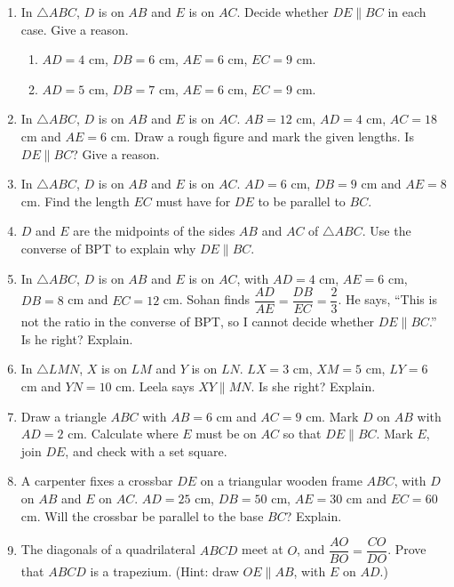 \documentclass[11pt,a4paper]{article}
\theoremstyle{brand}
\theoremstyle{branddef}
\newcommand{\tr}{\triangle}
\newenvironment{exercise}[1]
  {\par\medskip\Needspace{7\baselineskip}\noindent{\large\bfseries\color{accent}Exercise #1}
   \par\smallskip
   \begin{enumerate}[leftmargin=*,itemsep=4pt]}
  {\end{enumerate}}
\begin{document}
\begin{exercise}{2C}
  \item In $\tr ABC$, $D$ is on $AB$ and $E$ is on $AC$. Decide whether $DE\parallel BC$ in each case. Give a reason.
  \begin{enumerate}[label=(\alph*),itemsep=1pt]
    \item $AD=4$ cm, $DB=6$ cm, $AE=6$ cm, $EC=9$ cm.
    \item $AD=5$ cm, $DB=7$ cm, $AE=6$ cm, $EC=9$ cm.
  \end{enumerate}
  \item In $\tr ABC$, $D$ is on $AB$ and $E$ is on $AC$. $AB=12$ cm, $AD=4$ cm, $AC=18$ cm and $AE=6$ cm. Draw a rough figure and mark the given lengths. Is $DE\parallel BC$? Give a reason.
  \item In $\tr ABC$, $D$ is on $AB$ and $E$ is on $AC$. $AD=6$ cm, $DB=9$ cm and $AE=8$ cm. Find the length $EC$ must have for $DE$ to be parallel to $BC$.
  \item $D$ and $E$ are the midpoints of the sides $AB$ and $AC$ of $\tr ABC$. Use the converse of BPT to explain why $DE\parallel BC$.
  \item In $\tr ABC$, $D$ is on $AB$ and $E$ is on $AC$, with $AD=4$ cm, $AE=6$ cm, $DB=8$ cm and $EC=12$ cm. Sohan finds $\dfrac{AD}{AE}=\dfrac{DB}{EC}=\dfrac23$. He says, ``This is not the ratio in the converse of BPT, so I cannot decide whether $DE\parallel BC$.'' Is he right? Explain.
  \item In $\tr LMN$, $X$ is on $LM$ and $Y$ is on $LN$. $LX=3$ cm, $XM=5$ cm, $LY=6$ cm and $YN=10$ cm. Leela says $XY\parallel MN$. Is she right? Explain.
  \item Draw a triangle $ABC$ with $AB=6$ cm and $AC=9$ cm. Mark $D$ on $AB$ with $AD=2$ cm. Calculate where $E$ must be on $AC$ so that $DE\parallel BC$. Mark $E$, join $DE$, and check with a set square.
  \item A carpenter fixes a crossbar $DE$ on a triangular wooden frame $ABC$, with $D$ on $AB$ and $E$ on $AC$. $AD=25$ cm, $DB=50$ cm, $AE=30$ cm and $EC=60$ cm. Will the crossbar be parallel to the base $BC$? Explain.
  \item The diagonals of a quadrilateral $ABCD$ meet at $O$, and $\dfrac{AO}{BO}=\dfrac{CO}{DO}$. Prove that $ABCD$ is a trapezium. (Hint: draw $OE\parallel AB$, with $E$ on $AD$.)
  \begin{center}
\end{center}
\end{exercise}
\end{document}
